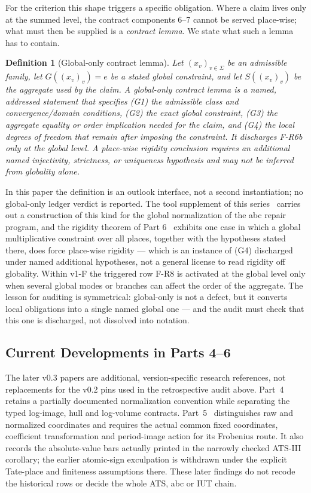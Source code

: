 \documentclass[11pt,a4paper]{article}
\newtheorem{definition}{Definition}[section]
\begin{document}
For the criterion this shape triggers a specific obligation. Where a claim
lives only at the summed level, the contract components 6--7 cannot be
served place-wise; what must then be supplied is a \emph{contract lemma}. We
state what such a lemma has to contain.

\begin{definition}[Global-only contract lemma]\label{def:globallemma}
Let $(x_v)_{v\in\Sigma}$ be an admissible family, let $G((x_v)_v)=e$ be a
stated global constraint, and let $S((x_v)_v)$ be the aggregate used by the
claim. A global-only contract lemma is a named, addressed statement that
specifies (G1) the admissible class and convergence/domain conditions, (G2)
the exact global constraint, (G3) the aggregate equality or order implication
needed for the claim, and (G4) the local degrees of freedom that remain after
imposing the constraint. It discharges F-R6b only at the global level. A
place-wise rigidity conclusion requires an additional named injectivity,
strictness, or uniqueness hypothesis and may not be inferred from globality
alone.
\end{definition}

In this paper the definition is an outlook interface, not a second
instantiation; no global-only ledger verdict is reported. The tool supplement
of this series~\cite{gnc} carries out a construction of this kind for the
global normalization of the abc repair program, and the rigidity theorem of
Part 6~\cite{part6} exhibits one case in which a global multiplicative
constraint over all places, together with the hypotheses stated there, does
force place-wise rigidity --- which is an instance of (G4) discharged under
named additional hypotheses, not a general license to read rigidity off
globality. Within v1-F the triggered row F-R8 is activated at the global level
only when several global modes or branches can affect the order of the
aggregate. The lesson for auditing is symmetrical: global-only is not a defect,
but it converts local obligations into a single named global one --- and the
audit must check that this one is discharged, not dissolved into notation.

\subsection{Current Developments in Parts 4--6}\label{sec:current-series}

The later v0.3 papers are additional, version-specific research references,
not replacements for the v0.2 pins used in the retrospective audit above.
Part~4~\cite{part4current} retains a partially documented normalization
convention while separating the typed log-image, hull and log-volume
contracts. Part~5~\cite{part5current} distinguishes raw and normalized
coordinates and requires the actual common fixed coordinates, coefficient
transformation and period-image action for its Frobenius route. It also
records the absolute-value bars actually printed in the narrowly checked
ATS-III corollary; the earlier atomic-sign exculpation is withdrawn under
the explicit Tate-place and finiteness assumptions there. These later
findings do not recode the historical rows or decide the whole ATS, abc or
IUT chain.
\end{document}
